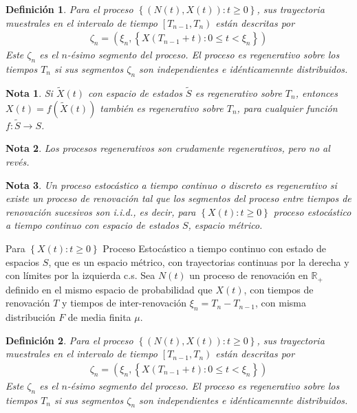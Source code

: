 \documentclass{article}
\newtheorem{Def}{Definición}[section]
\newtheorem{Note}{Nota}[section]
\newcommand{\rea}{\mathbb{R}}
\numberwithin{equation}{section}
\begin{document}
{\begin{Def}
Para el proceso $\left\{\left(N\left(t\right),X\left(t\right)\right):t\geq0\right\}$, sus trayectoria muestrales en el intervalo de tiempo $\left[T_{n-1},T_{n}\right)$ est\'an descritas por
\begin{eqnarray*}
\zeta_{n}=\left(\xi_{n},\left\{X\left(T_{n-1}+t\right):0\leq t<\xi_{n}\right\}\right)
\end{eqnarray*}
Este $\zeta_{n}$ es el $n$-\'esimo segmento del proceso. El proceso es regenerativo sobre los tiempos $T_{n}$ si sus segmentos $\zeta_{n}$ son independientes e id\'enticamennte distribuidos.
\end{Def}


\begin{Note}
Si $\tilde{X}\left(t\right)$ con espacio de estados $\tilde{S}$ es regenerativo sobre $T_{n}$, entonces $X\left(t\right)=f\left(\tilde{X}\left(t\right)\right)$ tambi\'en es regenerativo sobre $T_{n}$, para cualquier funci\'on $f:\tilde{S}\rightarrow S$.
\end{Note}

\begin{Note}
Los procesos regenerativos son crudamente regenerativos, pero no al rev\'es.
\end{Note}


\begin{Note}
Un proceso estoc\'astico a tiempo continuo o discreto es regenerativo si existe un proceso de renovaci\'on  tal que los segmentos del proceso entre tiempos de renovaci\'on sucesivos son i.i.d., es decir, para $\left\{X\left(t\right):t\geq0\right\}$ proceso estoc\'astico a tiempo continuo con espacio de estados $S$, espacio m\'etrico.
\end{Note}

Para $\left\{X\left(t\right):t\geq0\right\}$ Proceso Estoc\'astico a tiempo continuo con estado de espacios $S$, que es un espacio m\'etrico, con trayectorias continuas por la derecha y con l\'imites por la izquierda c.s. Sea $N\left(t\right)$ un proceso de renovaci\'on en $\rea_{+}$ definido en el mismo espacio de probabilidad que $X\left(t\right)$, con tiempos de renovaci\'on $T$ y tiempos de inter-renovaci\'on $\xi_{n}=T_{n}-T_{n-1}$, con misma distribuci\'on $F$ de media finita $\mu$.



\begin{Def}
Para el proceso $\left\{\left(N\left(t\right),X\left(t\right)\right):t\geq0\right\}$, sus trayectoria muestrales en el intervalo de tiempo $\left[T_{n-1},T_{n}\right)$ est\'an descritas por
\begin{eqnarray*}
\zeta_{n}=\left(\xi_{n},\left\{X\left(T_{n-1}+t\right):0\leq t<\xi_{n}\right\}\right)
\end{eqnarray*}
Este $\zeta_{n}$ es el $n$-\'esimo segmento del proceso. El proceso es regenerativo sobre los tiempos $T_{n}$ si sus segmentos $\zeta_{n}$ son independientes e id\'enticamennte distribuidos.
\end{Def}

}
\end{document}
